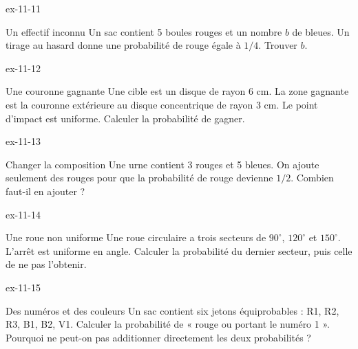\begin{blocLivre}{ex-11-11}\begin{exercice}[3]{Un effectif inconnu}
Un sac contient 5 boules rouges et un nombre $b$ de bleues. Un tirage au hasard donne une probabilité de rouge égale à $1/4$. Trouver $b$.
\end{exercice}\end{blocLivre}
\begin{blocLivre}{ex-11-12}\begin{exercice}[3]{Une couronne gagnante}
Une cible est un disque de rayon 6 cm. La zone gagnante est la couronne extérieure au disque concentrique de rayon 3 cm. Le point d’impact est uniforme. Calculer la probabilité de gagner.
\label{fig-ex-11-12}
\end{exercice}\end{blocLivre}
\begin{blocLivre}{ex-11-13}\begin{exercice}[3]{Changer la composition}
Une urne contient 3 rouges et 5 bleues. On ajoute seulement des rouges pour que la probabilité de rouge devienne $1/2$. Combien faut-il en ajouter ?
\end{exercice}\end{blocLivre}
\begin{blocLivre}{ex-11-14}\begin{exercice}[3]{Une roue non uniforme}
Une roue circulaire a trois secteurs de $90^\circ$, $120^\circ$ et $150^\circ$. L’arrêt est uniforme en angle. Calculer la probabilité du dernier secteur, puis celle de ne pas l’obtenir.
\label{fig-ex-11-14}
\end{exercice}\end{blocLivre}
\begin{blocLivre}{ex-11-15}\begin{exercice}[3]{Des numéros et des couleurs}
Un sac contient six jetons équiprobables : R1, R2, R3, B1, B2, V1. Calculer la probabilité de « rouge ou portant le numéro 1 ». Pourquoi ne peut-on pas additionner directement les deux probabilités ?
\label{fig-ex-11-15}
\end{exercice}\end{blocLivre}

\clearpage
